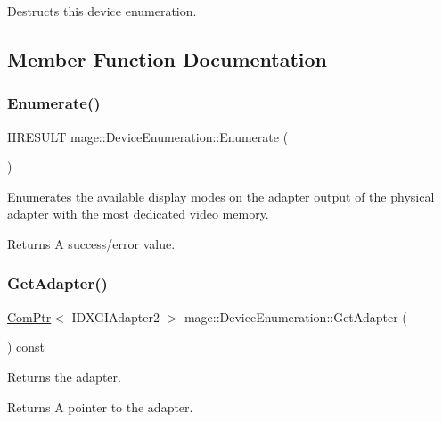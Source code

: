 Destructs this device enumeration. 

\subsection{Member Function Documentation}
\hypertarget{classmage_1_1_device_enumeration_a4fea0ffef733632456b281f74608a239}{}\label{classmage_1_1_device_enumeration_a4fea0ffef733632456b281f74608a239} 
\subsubsection{\texorpdfstring{Enumerate()}{Enumerate()}}
{\footnotesize\ttfamily H\+R\+E\+S\+U\+LT mage\+::\+Device\+Enumeration\+::\+Enumerate (\begin{DoxyParamCaption}{ }\end{DoxyParamCaption})\hspace{0.3cm}{\ttfamily [private]}}

Enumerates the available display modes on the adapter output of the physical adapter with the most dedicated video memory.

\begin{DoxyReturn}{Returns}
A success/error value. 
\end{DoxyReturn}
\hypertarget{classmage_1_1_device_enumeration_ad8a0702abdc70ea8fc1b6e46544839a1}{}\label{classmage_1_1_device_enumeration_ad8a0702abdc70ea8fc1b6e46544839a1} 
\subsubsection{\texorpdfstring{Get\+Adapter()}{GetAdapter()}}
{\footnotesize\ttfamily \hyperlink{namespacemage_ae74f374780900893caa5555d1031fd79}{Com\+Ptr}$<$ I\+D\+X\+G\+I\+Adapter2 $>$ mage\+::\+Device\+Enumeration\+::\+Get\+Adapter (\begin{DoxyParamCaption}{ }\end{DoxyParamCaption}) const}

Returns the adapter.

\begin{DoxyReturn}{Returns}
A pointer to the adapter. 
\end{DoxyReturn}
\hypertarget{classmage_1_1_device_enumeration_a533ac2f6ea91604a3ea3cc8d93c3de87}{}\label{classmage_1_1_device_enumeration_a533ac2f6ea91604a3ea3cc8d93c3de87} 
